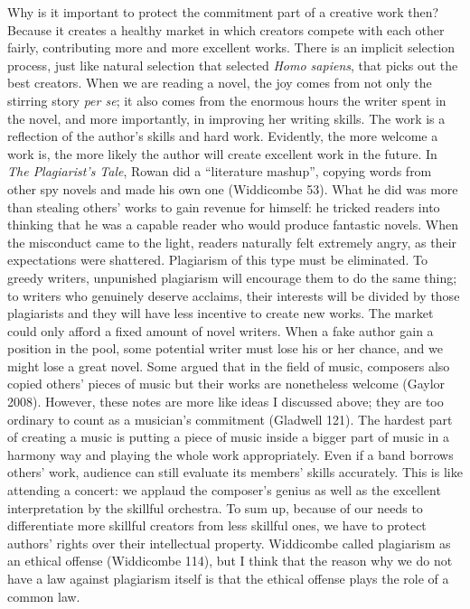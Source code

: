 \documentclass{writing}
\begin{document}
Why is it important to protect the commitment part of a creative work
then? Because it creates a healthy market in which creators compete with
each other fairly, contributing more and more excellent works. There is
an implicit selection process, just like natural selection that selected
\emph{Homo sapiens}, that picks out the best creators. When we are
reading a novel, the joy comes from not only the stirring story
\emph{per se}; it also comes from the enormous hours the writer spent in
the novel, and more importantly, in improving her writing skills. The
work is a reflection of the author's skills and hard work. Evidently,
the more welcome a work is, the more likely the author will create
excellent work in the future. In \emph{The Plagiarist's Tale}, Rowan did
a ``literature mashup'', copying words from other spy novels and made
his own one (Widdicombe 53). What he did was more than stealing others'
works to gain revenue for himself: he tricked readers into thinking that
he was a capable reader who would produce fantastic novels. When the
misconduct came to the light, readers naturally felt extremely angry, as
their expectations were shattered. Plagiarism of this type must be
eliminated. To greedy writers, unpunished plagiarism will encourage them
to do the same thing; to writers who genuinely deserve acclaims, their
interests will be divided by those plagiarists and they will have less
incentive to create new works. The market could only afford a fixed
amount of novel writers. When a fake author gain a position in the pool,
some potential writer must lose his or her chance, and we might lose a
great novel. Some argued that in the field of music, composers also
copied others' pieces of music but their works are nonetheless welcome
(Gaylor 2008). However, these notes are more like ideas I discussed
above; they are too ordinary to count as a musician's commitment
(Gladwell 121). The hardest part of creating a music is putting a piece
of music inside a bigger part of music in a harmony way and playing the
whole work appropriately. Even if a band borrows others' work, audience
can still evaluate its members' skills accurately. This is like
attending a concert: we applaud the composer's genius as well as the
excellent interpretation by the skillful orchestra. To sum up, because
of our needs to differentiate more skillful creators from less skillful
ones, we have to protect authors' rights over their intellectual
property. Widdicombe called plagiarism as an ethical offense (Widdicombe
114), but I think that the reason why we do not have a law against
plagiarism itself is that the ethical offense plays the role of a common
law.
\end{document}
